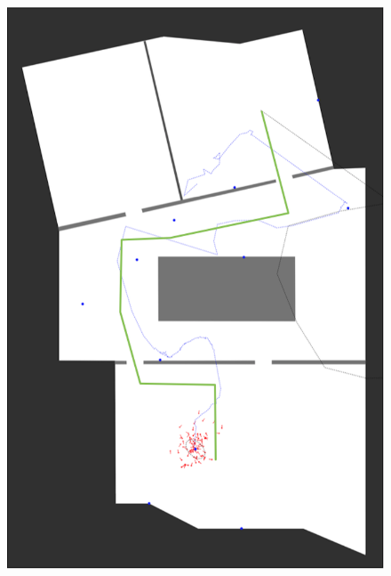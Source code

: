 \begin{figure}
{		\includegraphics[height=0.45\textheight]{figures/eval_3_2}
		\label{fig:exp2_imgs_2}
	}
	

\end{figure}
